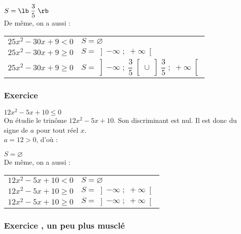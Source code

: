 \vspace*{.3cm}

$S = \lb \; \dfrac{3}{5} \; \rb $ \\

De même, on a aussi : \\

\begin{tabular}{ll}
$25x^2 -30x +9 < 0$ & $S = \varnothing $ \\
$25x^2 -30x +9 \geqslant 0$ & $S = \left]-\infty \; ; \; + \infty \right[$ \\
$25x^2 -30x +9 \geqslant 0$ & $S = \left]-\infty \; ; \; \dfrac{3}{5} \right[ \cup \left]\dfrac{3}{5} \; ; \; + \infty \right[$ \\
\end{tabular}

\subsubsection{Exercice }

$12x^2 -5x +10 \leqslant 0$ \\

On étudie le trinôme $12x^2 -5x +10$. Son discriminant est nul. Il est donc du signe de $a$ pour tout réel $x$. \\

$a = 12 > 0$, d'où : \\


\vspace*{.3cm}

$S = \varnothing $ \\

De même, on a aussi : \\

\begin{tabular}{ll}
$12x^2 -5x +10 < 0$ & $S = \varnothing $ \\
$12x^2 -5x +10 \geqslant 0$ & $S = \left]-\infty \; ; \; + \infty \right[$ \\
$12x^2 -5x +10 \geqslant 0$ & $S = \left]-\infty \; ; \; + \infty \right[$ \\
\end{tabular}

\newpage

\subsubsection{Exercice , un peu plus musclé}

